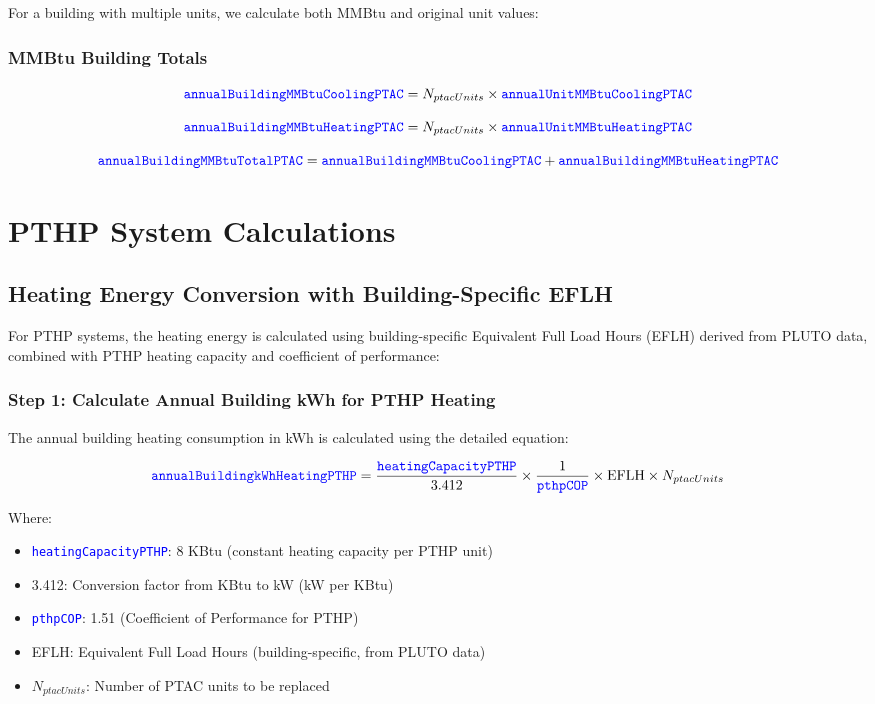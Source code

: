 \documentclass{article}
\newcommand{\code}[1]{\textcolor{blue}{\texttt{#1}}}
\begin{document}
For a building with multiple units, we calculate both MMBtu and original unit values:

\subsubsection{MMBtu Building Totals}
\begin{equation}
\code{annualBuildingMMBtuCoolingPTAC} = N_{ptacUnits} \times \code{annualUnitMMBtuCoolingPTAC}
\end{equation}

\begin{equation}
\code{annualBuildingMMBtuHeatingPTAC} = N_{ptacUnits} \times \code{annualUnitMMBtuHeatingPTAC}
\end{equation}

\begin{equation}
\code{annualBuildingMMBtuTotalPTAC} = \code{annualBuildingMMBtuCoolingPTAC} + \code{annualBuildingMMBtuHeatingPTAC}
\end{equation}


\section{PTHP System Calculations}

\subsection{Heating Energy Conversion with Building-Specific EFLH}

For PTHP systems, the heating energy is calculated using building-specific Equivalent Full Load Hours (EFLH) derived from PLUTO data, combined with PTHP heating capacity and coefficient of performance:

\subsubsection{Step 1: Calculate Annual Building kWh for PTHP Heating}

The annual building heating consumption in kWh is calculated using the detailed equation:

\begin{equation}
\code{annualBuildingkWhHeatingPTHP} = \frac{\code{heatingCapacityPTHP}}{3.412} \times \frac{1}{\code{pthpCOP}} \times \text{EFLH} \times N_{ptacUnits}
\end{equation}

Where:
\begin{itemize}
    \item \code{heatingCapacityPTHP}: 8 KBtu (constant heating capacity per PTHP unit)
    \item 3.412: Conversion factor from KBtu to kW (kW per KBtu)
    \item \code{pthpCOP}: 1.51 (Coefficient of Performance for PTHP)
    \item EFLH: Equivalent Full Load Hours (building-specific, from PLUTO data)
    \item $N_{ptacUnits}$: Number of PTAC units to be replaced
\end{itemize}
\end{document}

